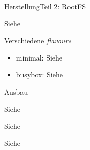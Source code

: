 \begin{frame}{Herstellung}{Teil 2: RootFS}
 \begin{description}[toolchain] 
  \item[LibC] Siehe 
  \item[toolchain] 
  \item[\unix] Verschiedene {\em flavours}
  \begin{itemize}
   \item minimal: Siehe 
   \item busybox: Siehe 
  \end{itemize}
 \end{description}
\end{frame}

\begin{frame}{Ausbau}
 \begin{description}[WLAN]
  \item[ssh]  Siehe 
  \item[WLAN] Siehe 
  \item[init] Siehe 
 \end{description}
\end{frame}
